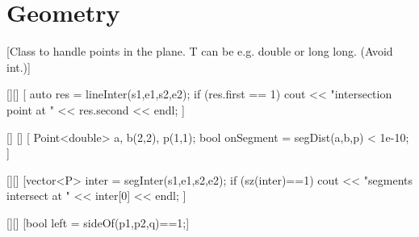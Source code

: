 
\chapter{Geometry}


[Class to handle points in the plane. T can be e.g. double or long long. (Avoid int.)]


[][]
[
    auto res = lineInter(s1,e1,s2,e2);
 	if (res.first == 1)
		cout << "intersection point at " << res.second << endl;
]

[]
[]
[
  Point<double> a, b(2,2), p(1,1);
 	bool onSegment = segDist(a,b,p) < 1e-10;
]

[][]
[vector<P> inter = segInter(s1,e1,s2,e2);
 if (sz(inter)==1)
   cout << "segments intersect at " << inter[0] << endl;
]

[][]
[bool left = sideOf(p1,p2,q)==1;]

